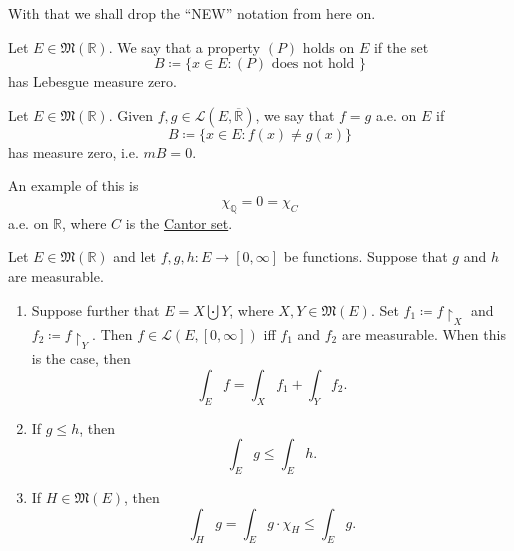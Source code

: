 \documentclass[notoc,notitlepage]{tufte-book}
\begin{document}
With that we shall drop the ``NEW'' notation from here on.

\begin{defn}\label{defn:almost_everywhere_a_e_}
  Let $E \in \mathfrak{M}(\mathbb{R})$. We say that a property $(P)$ holds
   on $E$ if the set
  \begin{equation*}
    B \coloneqq \{ x \in E : (P) \text{ does not hold } \}
  \end{equation*}
  has Lebesgue measure zero.
\end{defn}

\begin{eg}
  Let $E \in \mathfrak{M}(\mathbb{R})$. Given $f, g \in \mathcal{L}(E,
  \overline{\mathbb{R}})$, we say that $f = g$ a.e. on $E$ if
  \begin{equation*}
    B \coloneqq \{ x \in E : f(x) \neq g(x) \}
  \end{equation*}
  has measure zero, i.e. $mB = 0$.

  An example of this is
  \begin{equation*}
    \chi_{\mathbb{Q}} = 0 = \chi_{C}
  \end{equation*}
  a.e. on $\mathbb{R}$, where $C$ is the \hyperref[eg:cantor_set]{Cantor set}.
\end{eg}

\begin{lemma}\label{lemma:monotonicity_of_the_lebesgue_integral_and_other_lemmas}
  Let $E \in \mathfrak{M}(\mathbb{R})$ and let $f, g, h : E \to [0, \infty]$ be
  functions. Suppose that $g$ and $h$ are measurable.
  \begin{enumerate}
    \item Suppose further that $E = X \bigcupdot Y$, where $X, Y \in
      \mathfrak{M}(E)$. Set $f_1 \coloneqq f \restriction_{X}$ and $f_2
      \coloneqq f \restriction_{Y}$. Then $f \in \mathcal{L}(E, [0, \infty])$
      iff $f_1$ and $f_2$ are measurable. When this is the case, then
      \begin{equation*}
        \int_{E} f = \int_{X} f_1 + \int_{Y} f_2.
      \end{equation*}
    \item If $g \leq h$, then
      \begin{equation*}
        \int_{E} g \leq \int_{E} h.
      \end{equation*}
    \item If $H \in \mathfrak{M}(E)$, then
      \begin{equation*}
        \int_{H} g = \int_{E} g \cdot \chi_H \leq \int_{E} g.
      \end{equation*}
  \end{enumerate}
\end{lemma}
\end{document}
